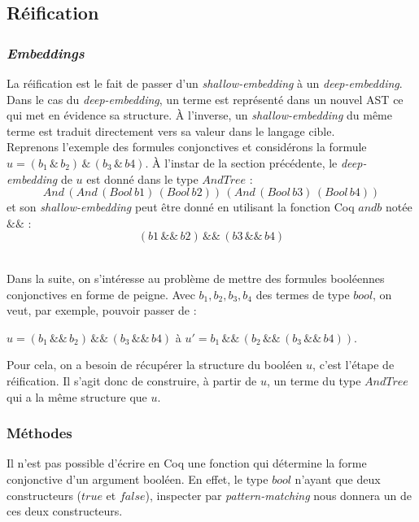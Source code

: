 \documentclass[11pt]{article}
\begin{document}
\subsection{Réification}

\subsubsection{\textit{Embeddings}}

La réification est le fait de passer d'un \textit{shallow-embedding} à un \textit{deep-embedding}. \\

Dans le cas du \textit{deep-embedding}, un terme est représenté dans un nouvel AST ce qui met en évidence sa structure. À l'inverse, un \textit{shallow-embedding} du même terme est traduit directement vers sa valeur dans le langage cible. \\

Reprenons l'exemple des formules conjonctives et considérons la formule $ u = (b_1 \,\&\, b_2) \,\&\, (b_3 \,\&\, b4)$. À l'instar de la section précédente, le \textit{deep-embedding} de $u$ est donné dans le type $AndTree$ :
\[And\,(And\,(Bool\,b1)\,(Bool\,b2))\,(And\,(Bool\,b3)\,(Bool\,b4))\] 
et son \textit{shallow-embedding} peut être donné en utilisant la fonction Coq $andb$ notée $\&\&$ : 
\[(b1\,\&\&\,b2)\,\&\&\,(b3\,\&\&\,b4) \]\,

Dans la suite, on s'intéresse au problème de mettre des formules booléennes conjonctives en forme de peigne. Avec $b_1, b_2, b_3, b_4$ des termes de type $bool$, on veut, par exemple, pouvoir passer de : 
\begin{center}
$ u = (b_1 \,\&\&\, b_2) \,\&\&\, (b_3 \,\&\&\, b4)$ \hspace{1cm} à   \hspace{1cm}  $u' = b_1 \,\&\&\, (b_2 \,\&\&\, (b_3 \,\&\&\, b4)). $
\end{center}

Pour cela, on a besoin de récupérer la structure du booléen $u$, c'est l'étape de réification. Il s'agit donc de construire, à partir de $u$, un terme du type $AndTree$ qui a la même structure que $u$. \\

\subsubsection{Méthodes}
Il n'est pas possible d'écrire en Coq une fonction qui détermine la forme conjonctive d'un argument booléen. En effet, le type $bool$ n'ayant que deux constructeurs ($true$ et $false$), inspecter par \textit{pattern-matching} nous donnera un de ces deux constructeurs.\\
\end{document}
